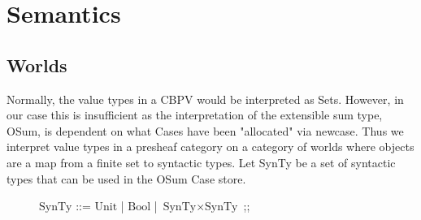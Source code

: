 \documentclass{article}
\begin{document}
\begin{comment}

\begin{prooftree}
\AxiomC{$\Gamma \vdash $}
\RightLabel{}
\UnaryInfC{$\Gamma \vdash$}
\end{prooftree}

\begin{prooftree}
\AxiomC{$\Gamma \vdash $}
\AxiomC{$\Gamma \vdash $}
\RightLabel{}
\BinaryInfC{$\Gamma \vdash$}
\end{prooftree}

\begin{prooftree}
\AxiomC{$\Gamma \vdash $}
\AxiomC{$\Gamma \vdash $}
\AxiomC{$\Gamma \vdash $}
\RightLabel{}
\TrinaryInfC{$\Gamma \vdash$}
\end{prooftree}

\end{comment}
\section{Semantics}
\subsection{Worlds}
Normally, the value types in a CBPV would be interpreted as Sets. However, in our case this is insufficient as 
the interpretation of the extensible sum type, OSum, is dependent on what Cases have been "allocated" via 
newcase. Thus we interpret value types in a presheaf category on a category of worlds where objects are a map 
from a finite set to syntactic types. Let SynTy be a set of syntactic types that can be used in the OSum Case store.

\begin{figure}[!ht]
\centering    
\begin{bnf}
$\textrm{SynTy}$ ::= $\textrm{Unit}$
| $\textrm{Bool}$
| $\textrm{SynTy} \times \textrm{SynTy}$
;;
\end{bnf}
\end{figure}
\end{document}
